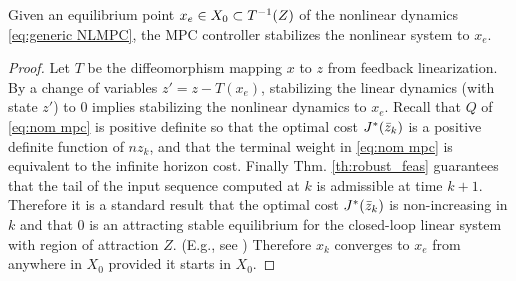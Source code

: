
\begin{theorem}[Stability]
	\label{thm:stability}
Given an equilibrium point $x_e \in X_0 \subset T^{-1}(Z)$ of the nonlinear dynamics \eqref{eq:generic NLMPC}, the MPC controller stabilizes the nonlinear system to $x_e$.
\end{theorem}

\begin{proof}
Let $T$ be the diffeomorphism mapping $x$ to $z$ from feedback linearization.
By a change of variables $z' = z - T(x_e)$, stabilizing the linear dynamics (with state $z'$) to 0 implies stabilizing the nonlinear dynamics to $x_e$.
Recall that $Q$ of  \eqref{eq:nom mpc} is positive definite so that the optimal cost $J^*(\bar{z}_{k})$ is a positive definite function of $nz_{k}$, and that the terminal weight in \eqref{eq:nom mpc} is equivalent to the infinite horizon cost. 
Finally Thm.  \ref{th:robust_feas} guarantees that the tail of the input sequence computed at $k$ is admissible at time $k+1$. 
Therefore it is a standard result that the optimal cost $J^{*}(\bar{z}_{k})$ is non-increasing in $k$ and that $0$ is an attracting stable equilibrium for the closed-loop linear system with region of attraction $Z$. (E.g., see \cite{CannonK15MPC} )
Therefore $x_k$ converges to $x_e$ from anywhere in $X_0$ provided it starts in $X_0$.
\end{proof}